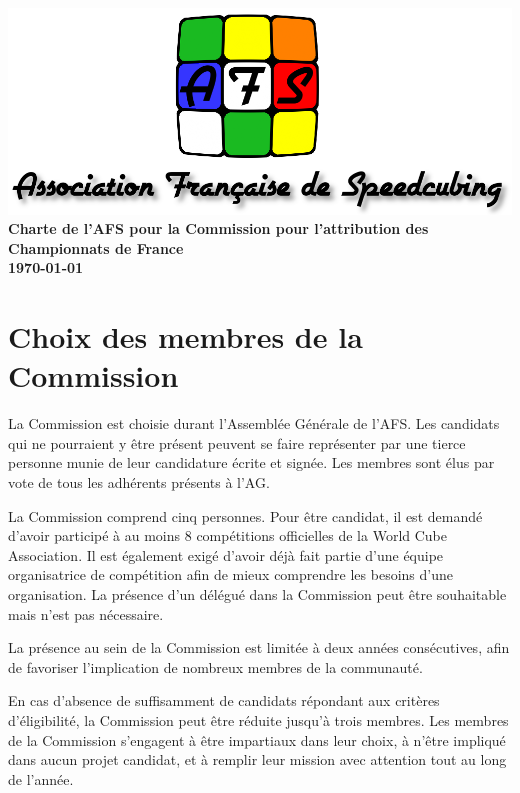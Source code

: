 \documentclass[a4paper,12pt]{scrartcl}
\newcommand{\documenttitle}{Charte de l'AFS pour la Commission pour l'attribution des Championnats de France}
\begin{document}

\begin{titlepage}
    \centering
    \vfill
    \includegraphics[width=\textwidth]{logoafsletters.png}
    \vfill
    {\bfseries\Huge
        \documenttitle \\
        \vskip5cm
\today
    }    
    \vfill
\end{titlepage}


\pagebreak


\section*{Choix des membres de la Commission}
La Commission est choisie durant l'Assemblée Générale de l'AFS. Les candidats qui ne pourraient y être présent peuvent se faire représenter par une tierce personne munie de leur candidature écrite et signée. Les membres sont élus par vote de tous les adhérents présents à l'AG.

La Commission comprend cinq personnes. Pour être candidat, il est demandé d'avoir participé à au moins 8 compétitions officielles de la World Cube Association. Il est également exigé d'avoir déjà fait partie d'une équipe organisatrice de compétition afin de mieux comprendre les besoins d'une organisation. La présence d'un délégué dans la Commission peut être souhaitable mais n'est pas nécessaire.

La présence au sein de la Commission est limitée à deux années consécutives, afin de favoriser l'implication de nombreux membres de la communauté.

En cas d'absence de suffisamment de candidats répondant aux critères d'éligibilité, la Commission peut être réduite jusqu'à trois membres. Les membres de la Commission s'engagent à être impartiaux dans leur choix, à n'être impliqué dans aucun projet candidat, et à remplir leur mission avec attention tout au long de l'année.
\end{document}
